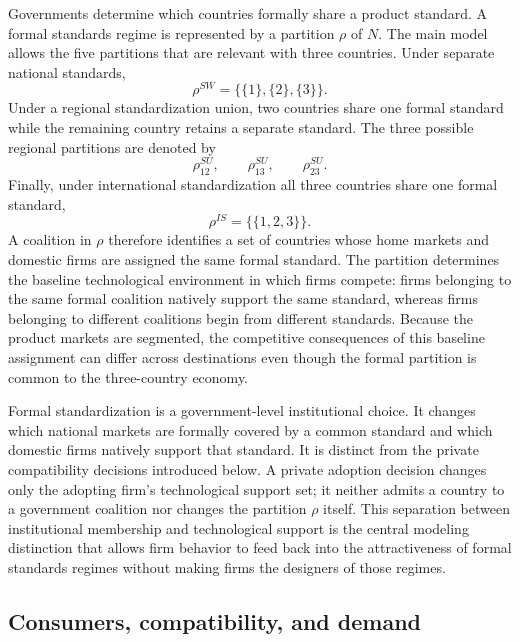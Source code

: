 Governments determine which countries formally share a product standard. A formal standards regime is represented by a partition $\rho$ of $N$. The main model allows the five partitions that are relevant with three countries. Under separate national standards,
\begin{equation}
    \rho^{SW}=\bigl\{\{1\},\{2\},\{3\}\bigr\}.
    \label{eq:partition-sw}
\end{equation}
Under a regional standardization union, two countries share one formal standard while the remaining country retains a separate standard. The three possible regional partitions are denoted by
\begin{equation}
    \rho_{12}^{SU},\qquad
    \rho_{13}^{SU},\qquad
    \rho_{23}^{SU}.
    \label{eq:partition-su}
\end{equation}
Finally, under international standardization all three countries share one formal standard,
\begin{equation}
    \rho^{IS}=\bigl\{\{1,2,3\}\bigr\}.
    \label{eq:partition-is}
\end{equation}
A coalition in $\rho$ therefore identifies a set of countries whose home markets and domestic firms are assigned the same formal standard. The partition determines the baseline technological environment in which firms compete: firms belonging to the same formal coalition natively support the same standard, whereas firms belonging to different coalitions begin from different standards. Because the product markets are segmented, the competitive consequences of this baseline assignment can differ across destinations even though the formal partition is common to the three-country economy.

Formal standardization is a government-level institutional choice. It changes which national markets are formally covered by a common standard and which domestic firms natively support that standard. It is distinct from the private compatibility decisions introduced below. A private adoption decision changes only the adopting firm's technological support set; it neither admits a country to a government coalition nor changes the partition $\rho$ itself. This separation between institutional membership and technological support is the central modeling distinction that allows firm behavior to feed back into the attractiveness of formal standards regimes without making firms the designers of those regimes.

\subsection{Consumers, compatibility, and demand}
\label{subsec:model-demand}

